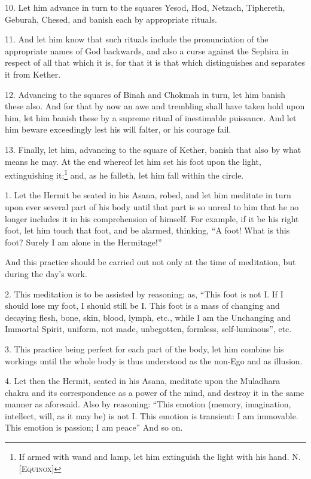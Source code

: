 10. Let him advance in turn to the squares Yesod, Hod, Netzach, Tiphereth, Geburah, Chesed, and banish each by appropriate rituals.

11. And let him know that such rituals include the pronunciation of the appropriate names of God backwards, and also a curse against the Sephira in respect of all that which it is, for that it is that which distinguishes and separates it from Kether.

12. Advancing to the squares of Binah and Chokmah in turn, let him banish these also. And for that by now an awe and trembling shall have taken hold upon him, let him banish these by a supreme ritual of inestimable puissance. And let him beware exceedingly lest his will falter, or his courage fail.

13. Finally, let him, advancing to the square of Kether, banish that also by what means he may. At the end whereof let him set his foot upon the light, extinguishing it;\footnote{If armed with wand and lamp, let him extinguish the light with his hand. \textemdash{} N. \textsc{[Equinox]}} and, as he falleth, let him fall within the circle.


1. Let the Hermit be seated in his Asana, robed, and let him meditate in turn upon ever several part of his body until that part is so unreal to him that he no longer includes it in his comprehension of himself. For example, if it be his right foot, let him touch that foot, and be alarmed, thinking, \enquote{A foot! What is this foot? Surely I am alone in the Hermitage!}

And this practice should be carried out not only at the time of meditation, but during the day's work.

2. This meditation is to be assisted by reasoning; as, \enquote{This foot is not I. If I should lose my foot, I should still be I. This foot is a mass of changing and decaying flesh, bone, skin, blood, lymph, etc., while I am the Unchanging and Immortal Spirit, uniform, not made, unbegotten, formless, self-luminous}, etc.

3. This practice being perfect for each part of the body, let him combine his workings until the whole body is thus understood as the non-Ego and as illusion.

4. Let then the Hermit, seated in his Asana, meditate upon the Muladhara chakra and its correspondence as a power of the mind, and destroy it in the same manner as aforesaid. Also by reasoning: \enquote{This emotion (memory, imagination, intellect, will, as it may be) is not I. This emotion is transient: I am immovable. This emotion is passion; I am peace} And so on.

